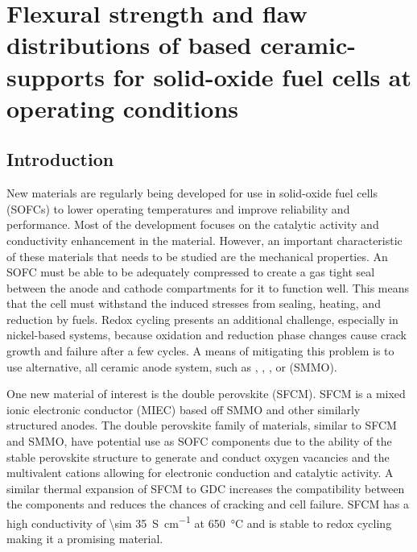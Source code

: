 
\chapter{Flexural strength and flaw distributions of  based ceramic-supports for solid-oxide fuel cells at operating conditions}

\section{Introduction}
    New materials are regularly being developed for use in solid-oxide fuel cells (SOFCs) to lower operating temperatures and improve reliability and performance.\cite{Wachsman2011a}
    Most of the development focuses on the catalytic activity and conductivity enhancement in the material.
    However, an important characteristic of these materials that needs to be studied are the mechanical properties.
    An SOFC must be able to be adequately compressed to create a gas tight seal between the anode and cathode compartments for it to function well.
    This means that the cell must withstand the induced stresses from sealing, heating, and reduction by fuels.
    Redox cycling presents an additional challenge, especially in nickel-based systems, because oxidation and reduction phase changes cause crack growth and failure after a few cycles.\cite{Radovic2004, Radovic2004b, Laurencin2010, Pihlatie2009, Laurencin2009, Yu2007, Sarantaridis2007}
    A means of mitigating this problem is to use alternative, all ceramic anode system, such as , , , or  (SMMO).\cite{Goodenough2007,Zha2005,Primdahl2001,Hussain2013,MohammedHussain2012,Hussain2016,Huang2006}

    One new material of interest is the double perovskite  (SFCM).\cite{Hussain,Hussaina,Pan}
    SFCM is a mixed ionic electronic conductor (MIEC) based off SMMO and other similarly structured anodes.
    The double perovskite family of materials, similar to SFCM and SMMO, have potential use as SOFC components due to the ability of the stable perovskite structure to generate and conduct oxygen vacancies and the multivalent cations allowing for electronic conduction and catalytic activity. \cite{Bernuy-Lopez2007, Huang2006a, Zhang2012}
    A similar thermal expansion of SFCM to GDC increases the compatibility between the components and reduces the chances of cracking and cell failure.
    SFCM has a high conductivity of \SI{\sim 35}{S\per\centi\meter} at \SI{650}{\celsius} and is stable to redox cycling making it a promising material.

